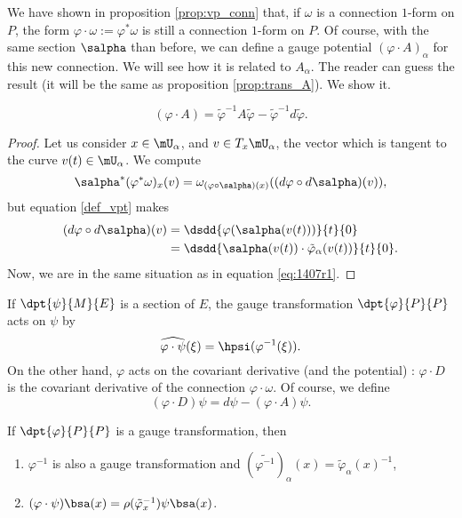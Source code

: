We have shown in proposition \ref{prop:vp_conn} that, if $\omega$ is a connection $1$-form on $P$, the form $\varphi\cdot\omega:=\varphi^*\omega$ is still a connection $1$-form on $P$. Of course, with the same section $\salpha$ than before, we can define a gauge potential $(\varphi\cdot A)_{\alpha}$ for this new connection. We will see how it is related to $A_{\alpha}$. The reader can guess the result (it will be the same as proposition \ref{prop:trans_A}). We show it.

\begin{proposition}		\label{Proptr_de_A}
\begin{equation}\label{tr_de_A}
     (\varphi\cdot A)=\tilde{\varphi}^{-1} A\tilde{\varphi}-\tilde{\varphi}^{-1} d\tilde{\varphi}.
\end{equation}
\end{proposition}
\begin{proof}
Let us consider $x\in\mU_{\alpha}$, and $v\in T_x\mU_{\alpha}$, the vector which is tangent to the curve $v(t)\in\mU_{\alpha}$. We compute
\[
    \salpha^*(\varphi^*\omega)_x(v)=\omega_{(\varphi\circ\salpha)(x)}((d\varphi\circ d\salpha)(v)),
\]
but equation \eqref{def_vpt} makes
\begin{equation}
\begin{split}
   (d\varphi\circ d\salpha)(v)&=\dsdd{\varphi(\salpha(v(t)))}{t}{0}\\
                          &=\dsdd{\salpha(v(t))\cdot\tilde{\varphi}_{\alpha}(v(t))}{t}{0}.
\end{split}
\end{equation}
Now, we are in the same situation as in equation \eqref{eq:1407r1}.
\end{proof}

If $\dpt{\psi}{M}{E}$ is a section of $E$, the gauge transformation $\dpt{\varphi}{P}{P}$ acts on $\psi$ by
\begin{equation}
   \widehat{\varphi\cdot\psi}(\xi)=\hpsi(\varphi^{-1}(\xi)).
\end{equation}
On the other hand, $\varphi$ acts on the covariant derivative (and the potential) :
$\varphi\cdot D$ is the covariant derivative  of the connection $\varphi\cdot\omega$. Of course, we define
\begin{equation}
    (\varphi\cdot D)\psi=d\psi-(\varphi\cdot A)\psi.
\end{equation}

\begin{lemma}
If $\dpt{\varphi}{P}{P}$ is a gauge transformation, then
\begin{enumerate}
\item $\varphi^{-1}$ is also a gauge transformation and
             $(\widetilde{\varphi^{-1}})_{\alpha}(x)=\tilde{\varphi}_{\alpha}(x)^{-1}$, \label{lem:i}
\item $(\varphi\cdot\psi)\bsa(x)=\rho(\tilde{\varphi}_x^{-1})\psi\bsa(x)$.\label{lem:ii}
\end{enumerate}
\label{lem:prop_gauge}
\end{lemma}

